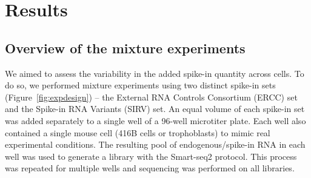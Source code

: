 \documentclass{article}
\begin{document}
% 

\section{Results}

\newcommand\variance{\mbox{var}}

\subsection{Overview of the mixture experiments}
We aimed to assess the variability in the added spike-in quantity across cells.
To do so, we performed mixture experiments using two distinct spike-in sets (Figure~\ref{fig:expdesign}) -- the External RNA Controls Consortium (ERCC) set and the Spike-in RNA Variants (SIRV) set.
An equal volume of each spike-in set was added separately to a single well of a 96-well microtiter plate.
Each well also contained a single mouse cell (416B cells or trophoblasts) to mimic real experimental conditions.
The resulting pool of endogenous/spike-in RNA in each well was used to generate a library with the Smart-seq2 protocol.
This process was repeated for multiple wells and sequencing was performed on all libraries.
\end{document}
